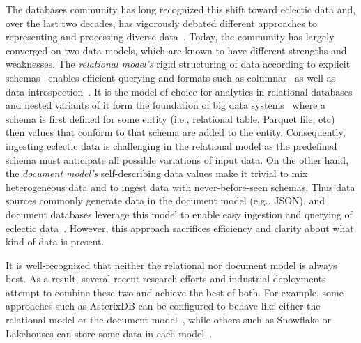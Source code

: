 The databases community has long recognized this shift toward eclectic data and, over the last two decades, has vigorously debated different approaches to representing and processing diverse data~. Today, the community has largely converged on two data models, which are known to have different strengths and weaknesses. The {\em relational model's} rigid structuring of data according to explicit schemas~ enables efficient querying and formats such as columnar~ as well as data introspection~\cite{aurum}.
It is the model of choice for analytics in relational databases and nested variants of it form the foundation of big data systems~\cite{avro, parquet, dremel, spark, delta_lake} where a schema is first defined for some entity (i.e., relational table, Parquet file, etc) then values that conform to that schema are added to the entity. Consequently, ingesting eclectic data is challenging in the relational model as the predefined schema must anticipate all possible variations of input data. On the other hand, the {\em document model's} self-describing data values make it trivial to mix heterogeneous data and to ingest data with never-before-seen schemas. Thus data sources commonly generate data in the document model (e.g., JSON), and document databases leverage this model to enable easy ingestion and querying of eclectic data~\cite{mongo, couchbase}. However, this approach sacrifices efficiency and clarity about what kind of data is present. 

It is well-recognized that neither the relational nor document model is always best.
As a result, several recent research efforts and industrial deployments attempt to combine these two and achieve the best of both. For example, some approaches such as AsterixDB can be configured to behave like either the relational model or the document model~\cite{asterixdb, sql++}, while others such as Snowflake or Lakehouses can store some data in each model~\cite{snowflake, postgres, bigdawg, dbms+, delta_lake, lakehouse}.

